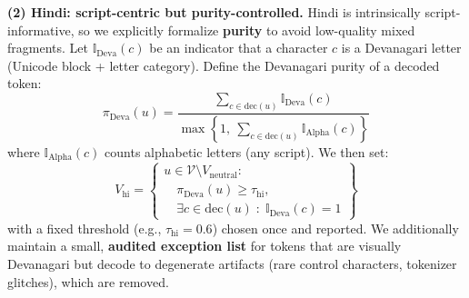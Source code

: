 \begin{itemize}[leftmargin=1.5em]
\begin{description}
\vspace{8pt}
\textbf{(2) Hindi: script-centric but purity-controlled.}
Hindi is intrinsically script-informative, so we explicitly formalize \textbf{purity} to avoid low-quality mixed fragments. Let $\mathbb{I}_{\mathrm{Deva}}(c)$ be an indicator that a character $c$ is a Devanagari letter (Unicode block + letter category). Define the Devanagari purity of a decoded token:
\[
\pi_{\mathrm{Deva}}(u)
=
\frac{
\sum_{c\in \mathrm{dec}(u)} \mathbb{I}_{\mathrm{Deva}}(c)
}{
\max\!\left\{1,\ 
\sum_{c\in \mathrm{dec}(u)}
\mathbb{I}_{\mathrm{Alpha}}(c)
\right\}
}
\]
where $\mathbb{I}_{\mathrm{Alpha}}(c)$ counts alphabetic letters (any script). We then set:
\[
V_{\mathrm{hi}} =
\left\{
\begin{aligned}
u \in \mathcal{V}\setminus V_{\mathrm{neutral}} :\\
\quad \pi_{\mathrm{Deva}}(u) \ge \tau_{\mathrm{hi}},\\
\quad \exists c \in \mathrm{dec}(u)\;:\;
\mathbb{I}_{\mathrm{Deva}}(c)=1
\end{aligned}
\right\}
\]
with a fixed threshold (e.g., $\tau_{\mathrm{hi}}=0.6$) chosen once and reported. We additionally maintain a small, \textbf{audited exception list} for tokens that are visually Devanagari but decode to degenerate artifacts (rare control characters, tokenizer glitches), which are removed.


\end{description}
\end{itemize}
